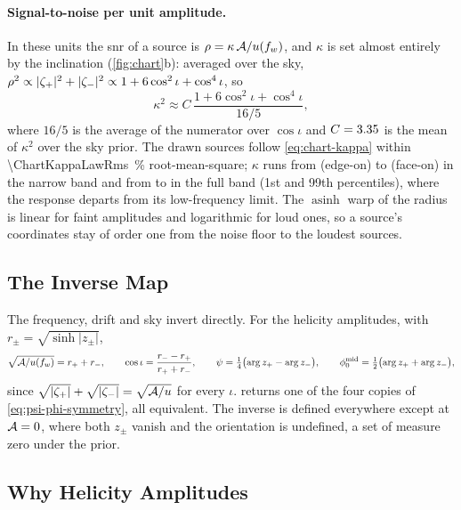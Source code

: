\paragraph{Signal-to-noise per unit amplitude.}
In these units the \ac{snr} of a source is $\rho = \kappa\,\mathcal{A}/u(f_{w})$, and $\kappa$ is set almost
entirely by the inclination (\cref{fig:chart}b): averaged over the sky,
$\rho^2\propto\lvert\zeta_+\rvert^2+\lvert\zeta_-\rvert^2\propto 1+6\cos^2\iota+\cos^4\iota$, so
\begin{equation}
  \kappa^2 \approx C\,\frac{1+6\cos^2\iota+\cos^4\iota}{16/5},
  \label{eq:chart-kappa}
\end{equation}
where $16/5$ is the average of the numerator over $\cos\iota$ and $C = 3.35{}$ is the
mean of $\kappa^2$ over the  sky prior. The drawn sources follow \cref{eq:chart-kappa}
within \qty{\ChartKappaLawRms}{\percent} root-mean-square; $\kappa$ runs from \ChartKappaNarrowLow{}
(edge-on) to \ChartKappaNarrowHigh{} (face-on) in the narrow band and from \ChartKappaFullLow{} to
\ChartKappaFullHigh{} in the full band (1st and 99th percentiles), where the response departs from
its low-frequency limit. The $\operatorname{asinh}$ warp of the radius is linear for faint
amplitudes and logarithmic for loud ones, so a source's coordinates stay of order one from the
noise floor to the loudest sources.

\subsection{The Inverse Map}
\label{app:chart-inverse}

The frequency, drift and sky invert directly. For the helicity amplitudes, with
$r_\pm = \sqrt{\sinh\lvert z_\pm\rvert}$,
\begin{equation}
  \sqrt{\mathcal{A}/u(f_{w})} = r_+ + r_-, \qquad
  \cos\iota = \frac{r_- - r_+}{r_+ + r_-}, \qquad
  \psi = \tfrac14\bigl(\arg z_+ - \arg z_-\bigr), \qquad
  \phi_0^{\rm mid} = \tfrac12\bigl(\arg z_+ + \arg z_-\bigr),
  \label{eq:chart-inverse}
\end{equation}
since $\sqrt{\lvert\zeta_+\rvert}+\sqrt{\lvert\zeta_-\rvert}=\sqrt{\mathcal{A}/u}$ for every $\iota$.
 returns one of the four copies of \cref{eq:psi-phi-symmetry}, all
equivalent. The inverse is defined everywhere except at $\mathcal{A}=0$, where both $z_\pm$ vanish and
the orientation is undefined, a set of measure zero under the prior.

\subsection{Why Helicity Amplitudes}
\label{app:chart-helicity}

